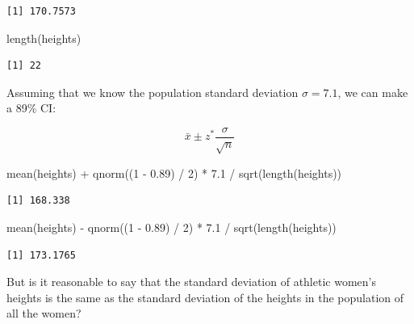 \documentclass[
  letterpaper,
  DIV=11,
  numbers=noendperiod,
  oneside]{scrreprt}
\newenvironment{Shaded}{\begin{snugshade}}{\end{snugshade}}
\newcommand{\DecValTok}[1]{\textcolor[rgb]{0.68,0.00,0.00}{#1}}
\newcommand{\FloatTok}[1]{\textcolor[rgb]{0.68,0.00,0.00}{#1}}
\newcommand{\FunctionTok}[1]{\textcolor[rgb]{0.28,0.35,0.67}{#1}}
\newcommand{\NormalTok}[1]{\textcolor[rgb]{0.00,0.23,0.31}{#1}}
\newcommand{\SpecialCharTok}[1]{\textcolor[rgb]{0.37,0.37,0.37}{#1}}
\begin{document}
\begin{verbatim}
[1] 170.7573
\end{verbatim}

\begin{Shaded}
\begin{Highlighting}[]
\FunctionTok{length}\NormalTok{(heights)}
\end{Highlighting}
\end{Shaded}

\begin{verbatim}
[1] 22
\end{verbatim}

Assuming that we know the population standard deviation
\(\sigma = 7.1\), we can make a 89\% CI:

\[
\bar x \pm z^*\frac{\sigma}{\sqrt{n}}
\]

\begin{Shaded}
\begin{Highlighting}[]
\FunctionTok{mean}\NormalTok{(heights) }\SpecialCharTok{+} \FunctionTok{qnorm}\NormalTok{((}\DecValTok{1} \SpecialCharTok{{-}} \FloatTok{0.89}\NormalTok{) }\SpecialCharTok{/} \DecValTok{2}\NormalTok{) }\SpecialCharTok{*} \FloatTok{7.1} \SpecialCharTok{/} \FunctionTok{sqrt}\NormalTok{(}\FunctionTok{length}\NormalTok{(heights))}
\end{Highlighting}
\end{Shaded}

\begin{verbatim}
[1] 168.338
\end{verbatim}

\begin{Shaded}
\begin{Highlighting}[]
\FunctionTok{mean}\NormalTok{(heights) }\SpecialCharTok{{-}} \FunctionTok{qnorm}\NormalTok{((}\DecValTok{1} \SpecialCharTok{{-}} \FloatTok{0.89}\NormalTok{) }\SpecialCharTok{/} \DecValTok{2}\NormalTok{) }\SpecialCharTok{*} \FloatTok{7.1} \SpecialCharTok{/} \FunctionTok{sqrt}\NormalTok{(}\FunctionTok{length}\NormalTok{(heights))}
\end{Highlighting}
\end{Shaded}

\begin{verbatim}
[1] 173.1765
\end{verbatim}

But is it reasonable to say that the standard deviation of athletic
women's heights is the same as the standard deviation of the heights in
the population of all the women?
\end{document}

